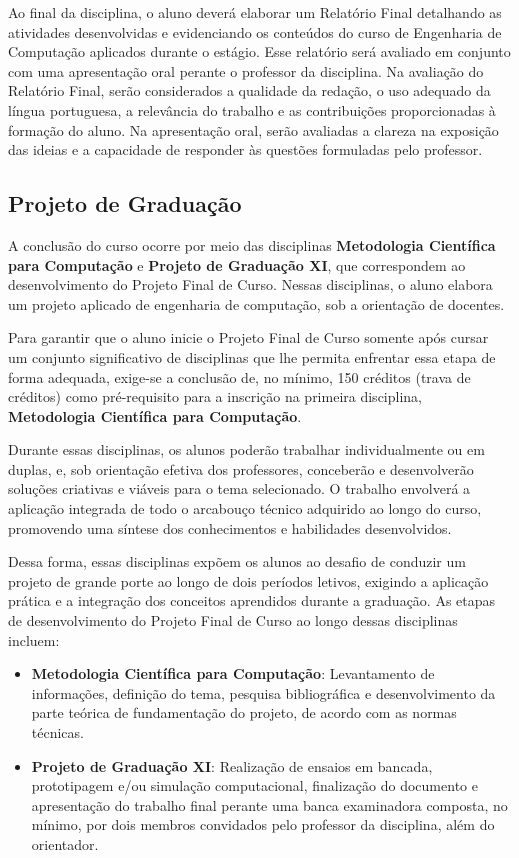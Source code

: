 Ao final da disciplina, o aluno deverá elaborar um Relatório Final detalhando as atividades desenvolvidas e evidenciando os conteúdos do curso de Engenharia de Computação aplicados durante o estágio. Esse relatório será avaliado em conjunto com uma apresentação oral perante o professor da disciplina. Na avaliação do Relatório Final, serão considerados a qualidade da redação, o uso adequado da língua portuguesa, a relevância do trabalho e as contribuições proporcionadas à formação do aluno. Na apresentação oral, serão avaliadas a clareza na exposição das ideias e a capacidade de responder às questões formuladas pelo professor.

\subsection{Projeto de Graduação}

A conclusão do curso ocorre por meio das disciplinas \textbf{Metodologia Científica para Computação} e \textbf{Projeto de Graduação XI}, que correspondem ao desenvolvimento do Projeto Final de Curso. Nessas disciplinas, o aluno elabora um projeto aplicado de engenharia de computação, sob a orientação de docentes.

Para garantir que o aluno inicie o Projeto Final de Curso somente após cursar um conjunto significativo de disciplinas que lhe permita enfrentar essa etapa de forma adequada, exige-se a conclusão de, no mínimo, 150 créditos (trava de créditos) como pré-requisito para a inscrição na primeira disciplina, \textbf{Metodologia Científica para Computação}.

Durante essas disciplinas, os alunos poderão trabalhar individualmente ou em duplas, e, sob orientação efetiva dos professores, conceberão e desenvolverão soluções criativas e viáveis para o tema selecionado. O trabalho envolverá a aplicação integrada de todo o arcabouço técnico adquirido ao longo do curso, promovendo uma síntese dos conhecimentos e habilidades desenvolvidos.

Dessa forma, essas disciplinas expõem os alunos ao desafio de conduzir um projeto de grande porte ao longo de dois períodos letivos, exigindo a aplicação prática e a integração dos conceitos aprendidos durante a graduação. As etapas de desenvolvimento do Projeto Final de Curso ao longo dessas disciplinas incluem:

\begin{itemize}
    \item \textbf{Metodologia Científica para Computação}: Levantamento de informações, definição do tema, pesquisa bibliográfica e desenvolvimento da parte teórica de fundamentação do projeto, de acordo com as normas técnicas.
    \item \textbf{Projeto de Graduação XI}: Realização de ensaios em bancada, prototipagem e/ou simulação computacional, finalização do documento e apresentação do trabalho final perante uma banca examinadora composta, no mínimo, por dois membros convidados pelo professor da disciplina, além do orientador.
\end{itemize}

